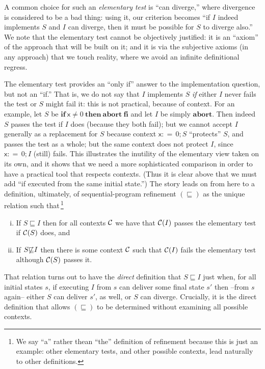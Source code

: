 \documentclass[runningheads]{llncs}
\newcommand\Vx {\mathsf{x}}
\newcommand\CC {{\cal C}}
\newcommand\Ref {\mathrel{\sqsubseteq}}
\newcommand\Gets {{:}{=}\,}
\newcommand\If {\textbf{if}}
\newcommand\Then {\textbf{then}}
\newcommand\Fi {\textbf{fi}}
\newcommand\Abort {\textbf{abort}}
\begin{document}
A common choice for such an \emph{elementary test} is ``can diverge,'' where divergence is considered to be a bad thing: using it, our criterion becomes ``if $I$ indeed implements $S$ and $I$ can diverge, then it must be possible for $S$ to diverge also.'' We note that the elementary test cannot be objectively justified: it is an ``axiom'' of the approach that will be built on it; and it is via the subjective axioms (in any approach) that we touch reality, where we avoid an infinite definitional regress.

The elementary test provides an ``only if'' answer to the implementation question, but not an ``if.'' That is, we do not say that $I$ implements $S$ \emph{if} either $I$ never fails the test or $S$ might fail it: this is not practical, because of context. For an example, let $S$ be $\If~\Vx{\neq}0~\Then~\Abort~\Fi$ and let $I$ be simply $\Abort$. Then indeed $S$ passes the test if $I$ does (because they both fail); but we cannot accept $I$ generally as a replacement for $S$ because context $\Vx\Gets0;S$ ``protects'' $S$, and passes the test as a whole; but the same context does not protect $I$, since $\Vx\Gets0;I$ (still) fails. This illustrates the inutility of the elementary view taken on its own, and it shows that we need a more sophisticated comparison in order to have a practical tool that respects contexts. (Thus it is clear above that we must add ``if executed from the same initial state.'') The story leads on from here to a definition, ultimately, of sequential-program refinement $(\Ref)$ as the unique relation such that\,\footnote{We say ``a'' rather thean ``the'' definition of refinement because this is just an example: other elementary tests, and other possible contexts, lead naturally to other definitions.}
\begin{enumerate}[(i)]
\item\label{i1253} If $S{\Ref}I$ then for all contexts $\CC$ we have that $\CC(I)$ passes the elementary test if $\CC(S)$ does, and
\item\label{i1254} If $S{\not\Ref}I$ then there is some context $\CC$ such that $\CC(I)$ fails the elementary test although $\CC(S)$ passes it.
\end{enumerate}
That relation turns out to have the \emph{direct} definition that $S{\Ref}I$ just when, for all initial states $s$,
if executing $I$ from $s$ can deliver some final state $s'$ then --from $s$ again-- either $S$ can deliver $s'$, as well, or $S$ can diverge. Crucially, it is the direct definition that allows $(\Ref)$ to be determined without examining all possible contexts.
\end{document}
